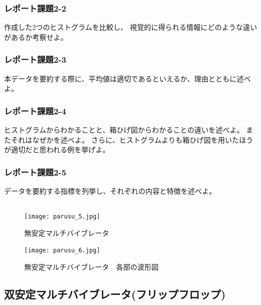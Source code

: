 \documentclass[12pt]{jarticle}
\begin{document}
\subsubsection*{レポート課題2-2}
\begin{shadebox}
    作成した2つのヒストグラムを比較し、
    視覚的に得られる情報にどのような違いがあるか考察せよ。
\end{shadebox}

\subsubsection*{レポート課題2-3}
\begin{shadebox}
    本データを要約する際に、平均値は適切であるといえるか、理由とともに述べよ。
\end{shadebox}

\subsubsection*{レポート課題2-4}
\begin{shadebox}
    ヒストグラムからわかることと、箱ひげ図からわかることの違いを述べよ。
    またそれはなぜかを述べよ。
    さらに、ヒストグラムよりも箱ひげ図を用いたほうが適切だと思われる例を挙げよ。
\end{shadebox}

\subsubsection*{レポート課題2-5}
\begin{shadebox}
    データを要約する指標を列挙し、それぞれの内容と特徴を述べよ。
\end{shadebox}

\subsection{}
\begin{figure}[h]
    \begin{center}
        \texttt{[image: parusu\_5.jpg]}
    \end{center}
    \caption{無安定マルチバイブレータ}
    \label{fig5}
    \begin{center}
        \texttt{[image: parusu\_6.jpg]}
    \end{center}
    \caption{無安定マルチバイブレータ　各部の波形図}
    \label{fig6}
\end{figure}

\subsection{双安定マルチバイブレータ(フリップフロップ)}
\end{document}
